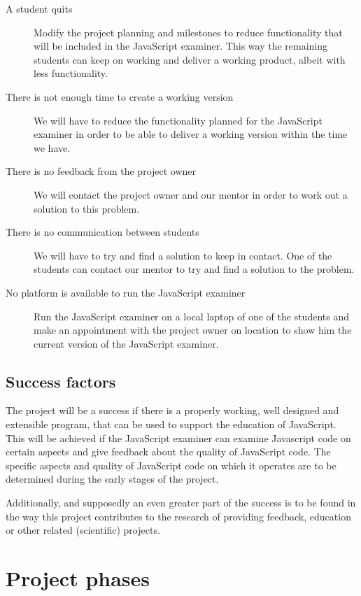 \documentclass{article}
\begin{document}
\begin{description}
  \item[A student quits] Modify the project planning and milestones to reduce
    functionality that will be included in the JavaScript examiner. This way
    the remaining students can keep on working and deliver a working product,
    albeit with less functionality.
  \item[There is not enough time to create a working version] We will have to
    reduce the functionality planned for the JavaScript examiner in order to be
    able to deliver a working version within the time we have.
  \item[There is no feedback from the project owner] We will contact the
    project owner and our mentor in order to work out a solution to this
    problem.
  \item[There is no communication between students] We will have to try and
    find a solution to keep in contact. One of the students can contact our
    mentor to try and find a solution to the problem.
  \item[No platform is available to run the JavaScript examiner] Run the
    JavaScript examiner on a local laptop of one of the students and make an
    appointment with the project owner on location to show him the current
    version of the JavaScript examiner.
\end{description}

\subsection{Success factors} 

The project will be a success if there is a properly working, well designed and
extensible program, that can be used to support the education of JavaScript.
This will be achieved if the JavaScript examiner can examine Javascript code on
certain aspects and give feedback about the quality of JavaScript code. The
specific aspects and quality of JavaScript code on which it operates are to be
determined during the early stages of the project.

Additionally, and supposedly an even greater part of the success is to be found
in the way this project contributes to the research of providing feedback,
education or other related (scientific) projects.

\section{Project phases} 
\end{document}
